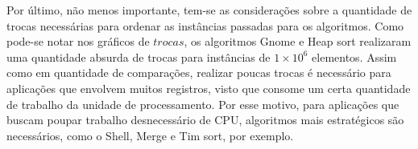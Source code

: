 \documentclass[report]{uftex}
\begin{document}
	Por último, não menos importante, tem-se as considerações sobre a quantidade de trocas necessárias para ordenar as instâncias passadas para os algoritmos. Como pode-se notar nos gráficos de $trocas$, os algoritmos Gnome e Heap sort realizaram uma quantidade absurda de trocas para instâncias de $1\times10^{6}$ elementos. Assim como em quantidade de comparações, realizar poucas trocas é necessário para aplicações que envolvem muitos registros, visto que consome um certa quantidade de trabalho da unidade de processamento. Por esse motivo, para aplicações que buscam poupar trabalho desnecessário de CPU, algoritmos mais estratégicos são necessários, como o Shell, Merge e Tim sort, por exemplo.\\



\backmatter 
\singlespacing   


\appendix
\onehalfspacing
\end{document}
